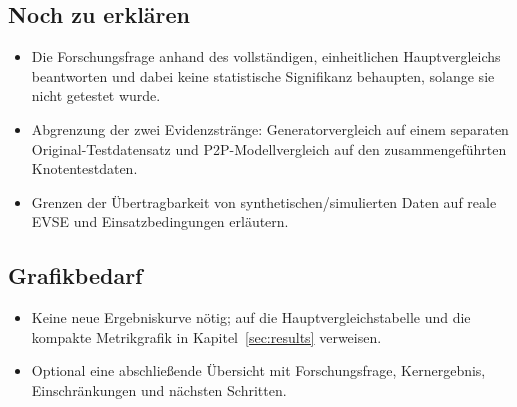 \subsection{Noch zu erklären}
\begin{itemize}
  \item Die Forschungsfrage anhand des vollständigen, einheitlichen
        Hauptvergleichs beantworten und dabei keine statistische
        Signifikanz behaupten, solange sie nicht getestet wurde.
  \item Abgrenzung der zwei Evidenzstränge: Generatorvergleich auf einem
        separaten Original-Testdatensatz und P2P-Modellvergleich auf den
        zusammengeführten Knotentestdaten.
  \item Grenzen der Übertragbarkeit von synthetischen/simulierten Daten auf
        reale EVSE und Einsatzbedingungen erläutern.
\end{itemize}

\subsection{Grafikbedarf}
\begin{itemize}
  \item Keine neue Ergebniskurve nötig; auf die Hauptvergleichstabelle
        und die kompakte Metrikgrafik in Kapitel~\ref{sec:results} verweisen.
  \item Optional eine abschließende Übersicht mit Forschungsfrage,
        Kernergebnis, Einschränkungen und nächsten Schritten.
\end{itemize}
